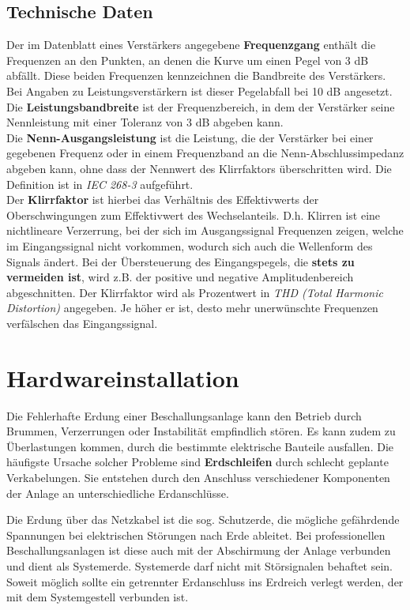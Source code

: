 \subsection{Technische Daten}
\label{sub:Technische Daten1}
Der im Datenblatt eines Verstärkers angegebene \textbf{Frequenzgang} enthält die Frequenzen an den Punkten, an denen die Kurve um einen Pegel von 3 dB abfällt. Diese beiden Frequenzen kennzeichnen die Bandbreite des Verstärkers. Bei Angaben zu Leistungsverstärkern ist dieser Pegelabfall bei 10 dB angesetzt.\\
Die \textbf{Leistungsbandbreite} ist der Frequenzbereich, in dem der Verstärker seine Nennleistung mit einer Toleranz von 3 dB abgeben kann.\\
Die \textbf{Nenn-Ausgangsleistung} ist die Leistung, die der Verstärker bei einer gegebenen Frequenz oder in einem Frequenzband an die Nenn-Abschlussimpedanz abgeben kann, ohne dass der Nennwert des Klirrfaktors überschritten wird. Die Definition ist in \textit{IEC 268-3} aufgeführt. \\
Der \textbf{Klirrfaktor} ist hierbei das Verhältnis des Effektivwerts der Oberschwingungen zum Effektivwert des Wechselanteils. D.h. Klirren ist eine nichtlineare Verzerrung, bei der sich im Ausgangssignal Frequenzen zeigen, welche im Eingangssignal nicht vorkommen, wodurch sich auch die Wellenform des Signals ändert. Bei der Übersteuerung des Eingangspegels, die \textbf{stets zu vermeiden ist}, wird z.B. der positive und negative Amplitudenbereich abgeschnitten.
Der Klirrfaktor wird als Prozentwert in \textit{THD (Total Harmonic Distortion)} angegeben. Je höher er ist, desto mehr unerwünschte Frequenzen verfälschen das Eingangssignal.

\section{Hardwareinstallation}
\label{sec:Hardwareinstallation}
Die Fehlerhafte Erdung einer Beschallungsanlage kann den Betrieb durch Brummen, Verzerrungen oder Instabilität empfindlich stören. Es kann zudem zu Überlastungen 
kommen, durch die bestimmte elektrische Bauteile ausfallen. Die häufigste Ursache solcher Probleme sind \textbf{Erdschleifen} durch schlecht geplante Verkabelungen. Sie entstehen durch den Anschluss verschiedener Komponenten der Anlage an unterschiedliche Erdanschlüsse.

Die Erdung über das Netzkabel ist die sog. Schutzerde, die mögliche gefährdende Spannungen bei elektrischen Störungen nach Erde ableitet.
Bei professionellen Beschallungsanlagen ist diese auch mit der Abschirmung der Anlage verbunden und dient als Systemerde. Systemerde darf nicht mit Störsignalen behaftet sein. Soweit möglich sollte ein getrennter Erdanschluss ins Erdreich verlegt werden, der mit dem Systemgestell verbunden ist.

